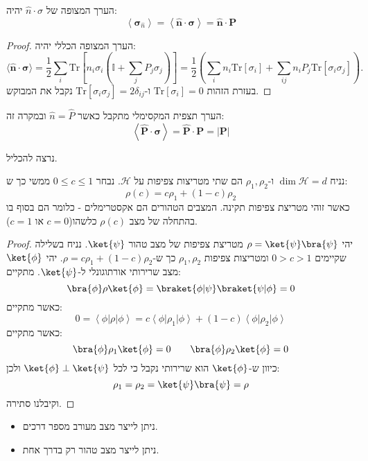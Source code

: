 \documentclass{tstextbook}
\begin{document}
\begin{proposition}
הערך המצופה של \(\hat{n}\cdot \sigma\) יהיה:
$$\left\langle  \boldsymbol\sigma_{\hat{n}}  \right\rangle= \left\langle{\hat{\mathbf{n}}}\cdot\boldsymbol\sigma\right\rangle={\hat{\mathbf{n}}}\cdot\mathbf{P}$$

\end{proposition}
\begin{proof}
הערך המצופה הכללי יהיה:
$$\langle\hat{\mathbf{n}}\cdot\boldsymbol\sigma\rangle={\frac{1}{2}}\sum_{i}\mathrm{Tr}\left[n_{i}\sigma_{i}\left(\mathbb{I}+\sum_{j}P_{j}\sigma_{j}\right)\right]={\frac{1}{2}}\left(\sum_{i}n_{i}\mathrm{Tr}\left[\sigma_{i}\right]+\sum_{i j}n_{i}P_{j}\mathrm{Tr}\left[\sigma_{i}\sigma_{j}\right]\right).$$
בעזרת הזהות \(\mathrm{Tr}\left[ \sigma_{i} \right]=0\) ו-\(\mathrm{Tr}\left[ \sigma_{i}\sigma_{j} \right]=2\delta_{ij}\) נקבל את המבוקש.

\end{proof}
\begin{remark}
הערך תצפית המקסימלי מתקבל כאשר \(\hat{n}=\hat{P}\) ובמקרה זה:
$$\left\langle{\hat{\mathbf{P}}}\cdot\boldsymbol\sigma\right\rangle={\hat{\mathbf{P}}}\cdot\mathbf{P}=|\mathbf{P}|$$

\end{remark}
נרצה להכליל. 

\begin{proposition}
נניח \(\dim\mathcal{H}=d\) ו-\(\rho_{1},\rho_{2}\) הם שתי מטריצות צפיפות על \(\mathcal{H}\). נבחר \(0\leq c\leq 1\) ממשי כך ש:
$$\rho(c)=c\rho_{1}+(1-c)\rho_{2}$$
כאשר זוהי מטריצת צפיפות תקינה. המצבים הטהורים הם אקסטרימלים - כלומר הם בסוף בו בהתחלה של מצב \(\rho(c)\) כלשהו(\(c=0\) או \(c=1\)).

\end{proposition}
\begin{proof}
יהי \(\rho=\ket{\psi}\bra{\psi}\) מטריצת צפיפות של מצב טהור \(\ket{\psi}\). נניח בשלילה שקיימים \(0>c>1\) ומטריצות צפיפות \(\rho_{1},\rho_{2}\) כך ש-\(\rho=c\rho_{1}+(1-c)\rho_{2}\). יהי \(\ket{\phi}\) מצב שרירותי אורתוגונלי ל-\(\ket{\psi}\). מתקיים:
$$\bra{\phi} \rho \ket{\phi} =\braket{ \phi | \psi } \braket{ \psi | \phi } =0  $$
כאשר מתקיים:
$$0=\left\langle\phi\right|\rho\left|\phi\right\rangle=c\left\langle\phi\right|\rho_{1}\left|\phi\right\rangle+\left(1-c\right)\left\langle\phi\right|\rho_{2}\left|\phi\right\rangle$$
כאשר מתקיים:
$$\bra{\phi} \rho_{1} \ket{\phi} =0\qquad \bra{\phi} \rho_{2}\ket{\phi} =0$$
כיוון ש-\(\ket{\phi}\) הוא שרירותי נקבל כי לכל \(\ket{\phi}\perp \ket{\psi}\) ולכן:
$$\rho_{1}=\rho_{2}=\ket{\psi} \bra{\psi} =\rho$$
וקיבלנו סתירה.

\end{proof}
\begin{corollary}
  \begin{itemize}
    \item ניתן לייצר מצב מעורב מספר דרכים.
    \item ניתן לייצר מצב טהור רק בדרך אחת.
  \end{itemize}
\end{corollary}
\end{document}
